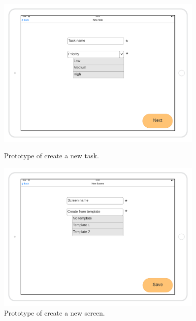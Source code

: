 \begin{figure}[H]
    \centering
    \begin{minipage}{0.45\textwidth}
        \centering
        \includegraphics[width=0.9\textwidth]{images/Create-new-task-mockup.png}
        \caption{Prototype of create a new task.}
    \end{minipage}\hfill
    \begin{minipage}{0.45\textwidth}
        \centering
        \includegraphics[width=0.9\textwidth]{images/Create-new-screen-mockup.png}
        \caption{Prototype of create a new screen.}
    \end{minipage}
\end{figure}

